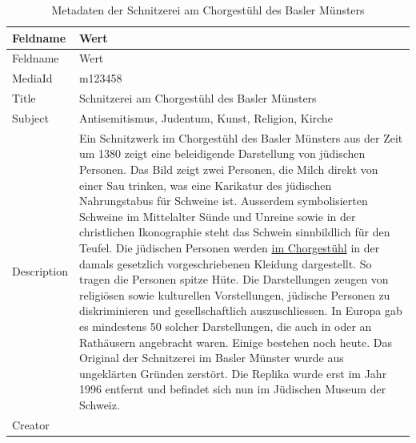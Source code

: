 \documentclass[
  letterpaper,
  DIV=11,
  numbers=noendperiod]{scrartcl}
\begin{document}
\begin{longtable}[]{@{}
  >{\raggedright\arraybackslash}p{}
  >{\raggedright\arraybackslash}p{}@{}}
\caption{Metadaten der Schnitzerei am Chorgestühl des Basler
Münsters}\label{tbl-metadaten-schnitzerei-am-chorgestuehl-des-basler-muensters}\tabularnewline
\toprule\noalign{}
\begin{minipage}[b]{\linewidth}\raggedright
Feldname
\end{minipage} & \begin{minipage}[b]{\linewidth}\raggedright
Wert
\end{minipage} \\
\midrule\noalign{}
\endfirsthead
\toprule\noalign{}
\begin{minipage}[b]{\linewidth}\raggedright
Feldname
\end{minipage} & \begin{minipage}[b]{\linewidth}\raggedright
Wert
\end{minipage} \\
\midrule\noalign{}
\endhead
\bottomrule\noalign{}
\endlastfoot
MediaId & m123458 \\
Title & Schnitzerei am Chorgestühl des Basler Münsters \\
Subject & Antisemitismus, Judentum, Kunst, Religion, Kirche \\
Description & Ein Schnitzwerk im Chorgestühl des Basler Münsters aus der
Zeit um 1380 zeigt eine beleidigende Darstellung von jüdischen Personen.
Das Bild zeigt zwei Personen, die Milch direkt von einer Sau trinken,
was eine Karikatur des jüdischen Nahrungstabus für Schweine ist.
Ausserdem symbolisierten Schweine im Mittelalter Sünde und Unreine sowie
in der christlichen Ikonographie steht das Schwein sinnbildlich für den
Teufel. Die jüdischen Personen werden
\href{https://www.gra.ch/bildung/glossar/judensau/}{im Chorgestühl} in
der damals gesetzlich vorgeschriebenen Kleidung dargestellt. So tragen
die Personen spitze Hüte. Die Darstellungen zeugen von religiösen sowie
kulturellen Vorstellungen, jüdische Personen zu diskriminieren und
gesellschaftlich auszuschliessen. In Europa gab es mindestens 50 solcher
Darstellungen, die auch in oder an Rathäusern angebracht waren. Einige
bestehen noch heute. Das Original der Schnitzerei im Basler Münster
wurde aus ungeklärten Gründen zerstört. Die Replika wurde erst im Jahr
1996 entfernt und befindet sich nun im Jüdischen Museum der Schweiz. \\
Creator & \\

\end{longtable}
\end{document}
